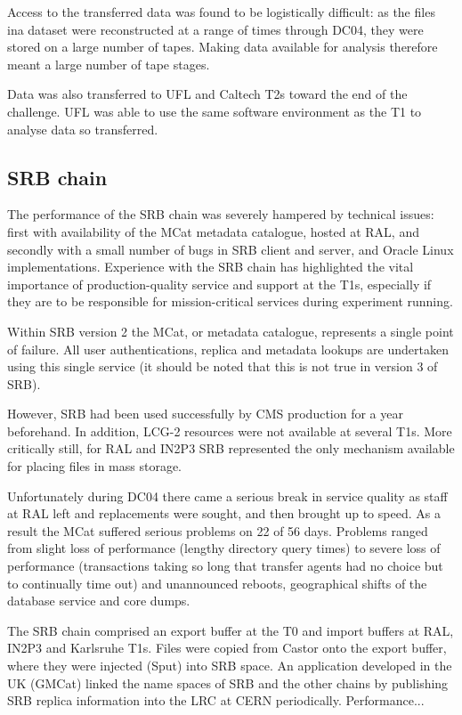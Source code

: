 \documentclass{cmspaper}
\begin{document}
Access to the transferred data was found to be logistically difficult: as the files ina  dataset were reconstructed at a range of times through DC04, they were stored on a large number of tapes. Making data available for analysis therefore meant a large number of tape stages.

Data was also transferred to UFL and Caltech T2s toward the end of the challenge. UFL was able to use the same software environment as the T1 to analyse data so transferred.

\subsection{SRB chain}
The performance of the SRB chain was severely hampered by technical issues:
first with availability of the MCat metadata catalogue, hosted at RAL, and
secondly with a small number of bugs in SRB client and server, and Oracle
Linux implementations. Experience with the SRB chain has highlighted the vital importance of production-quality service and support at the T1s, especially if they are to be responsible for mission-critical services during experiment running.

Within SRB version 2 the MCat, or metadata catalogue, represents a single point of failure. All user authentications, replica and metadata lookups are undertaken using this single service (it should be noted that this is not true in version 3 of SRB). 

However, SRB had been used successfully by CMS production for a year beforehand. In addition, LCG-2 resources were not available at several T1s. More critically still, for RAL and IN2P3 SRB represented the only mechanism available for placing files in mass storage.

Unfortunately during DC04 there came a serious break in service quality as staff at RAL left and replacements were sought, and then brought up to speed. As a result the MCat suffered serious problems on 22 of 56 days. Problems ranged from slight loss of performance (lengthy directory query times) to severe loss of performance (transactions taking so long that transfer agents had no choice but to continually time out) and unannounced reboots, geographical shifts of the database service and core dumps.

The SRB chain comprised an export buffer at the T0 and import buffers at RAL, IN2P3 and Karlsruhe T1s. Files were copied from Castor onto the export buffer, where they were injected (Sput) into SRB space. An application developed in the UK (GMCat) linked the name spaces of SRB and the other chains by publishing SRB replica information into the LRC at CERN periodically. Performance...
\end{document}
